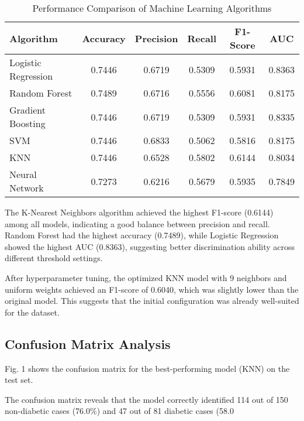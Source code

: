 \documentclass[conference]{IEEEtran}
\begin{document}
\begin{itemize}
\begin{table}[htbp]
\caption{Performance Comparison of Machine Learning Algorithms}
\begin{center}
\begin{tabular}{|l|c|c|c|c|c|}
\hline
\textbf{Algorithm} & \textbf{Accuracy} & \textbf{Precision} & \textbf{Recall} & \textbf{F1-Score} & \textbf{AUC} \\
\hline
Logistic Regression & 0.7446 & 0.6719 & 0.5309 & 0.5931 & 0.8363 \\
\hline
Random Forest & 0.7489 & 0.6716 & 0.5556 & 0.6081 & 0.8175 \\
\hline
Gradient Boosting & 0.7446 & 0.6719 & 0.5309 & 0.5931 & 0.8335 \\
\hline
SVM & 0.7446 & 0.6833 & 0.5062 & 0.5816 & 0.8175 \\
\hline
KNN & 0.7446 & 0.6528 & 0.5802 & 0.6144 & 0.8034 \\
\hline
Neural Network & 0.7273 & 0.6216 & 0.5679 & 0.5935 & 0.7849 \\
\hline
\end{tabular}
\label{tab1}
\end{center}
\end{table}

The K-Nearest Neighbors algorithm achieved the highest F1-score (0.6144) among all models, indicating a good balance between precision and recall. Random Forest had the highest accuracy (0.7489), while Logistic Regression showed the highest AUC (0.8363), suggesting better discrimination ability across different threshold settings.

After hyperparameter tuning, the optimized KNN model with 9 neighbors and uniform weights achieved an F1-score of 0.6040, which was slightly lower than the original model. This suggests that the initial configuration was already well-suited for the dataset.

\subsection{Confusion Matrix Analysis}
Fig. 1 shows the confusion matrix for the best-performing model (KNN) on the test set.

The confusion matrix reveals that the model correctly identified 114 out of 150 non-diabetic cases (76.0\%) and 47 out of 81 diabetic cases (58.0%


\end{itemize}
\end{document}

